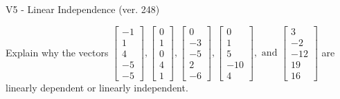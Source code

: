 \begin{exercise}
  \begin{exerciseTitle}V5 - Linear Independence (ver. 248)\end{exerciseTitle}
  \begin{exerciseStatement}
    Explain why the vectors \(\left[\begin{array}{r}
-1 \\
1 \\
4 \\
-5 \\
-5
\end{array}\right] , \left[\begin{array}{r}
0 \\
1 \\
0 \\
4 \\
1
\end{array}\right] , \left[\begin{array}{r}
0 \\
-3 \\
-5 \\
2 \\
-6
\end{array}\right] , \left[\begin{array}{r}
0 \\
1 \\
5 \\
-10 \\
4
\end{array}\right] , \text{ and } \left[\begin{array}{r}
3 \\
-2 \\
-12 \\
19 \\
16
\end{array}\right]\) are linearly dependent or linearly independent.	



\end{exerciseStatement}
\end{exercise}
